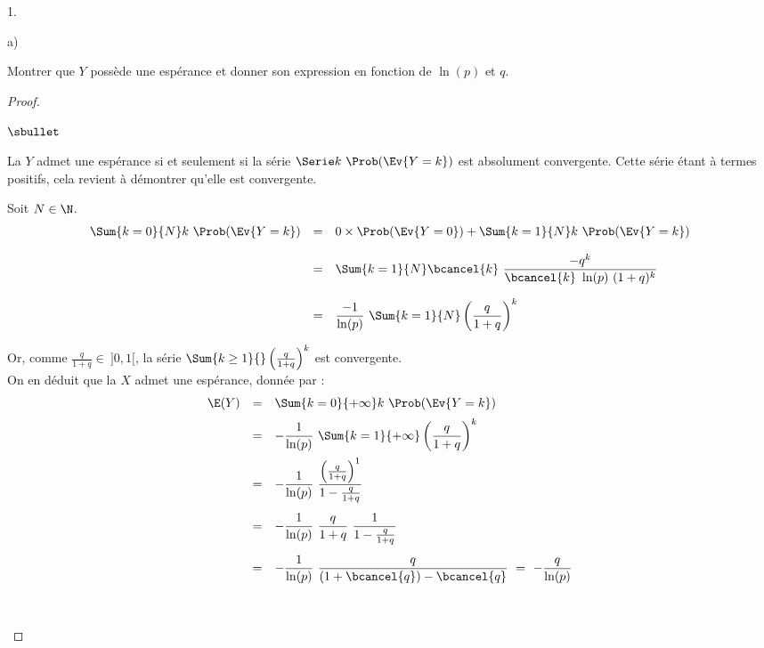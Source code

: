 \documentclass[11pt]{article}%
\begin{document}
\begin{noliste}{1.}
\begin{noliste}{a)}
  \item Montrer que $Y$ possède une espérance et donner son expression
    en fonction de $\ln(p)$ et $q$.

    \begin{proof}~%
      \begin{noliste}{$\sbullet$}
      \item La \var $Y$ admet une espérance si et seulement si la
        série $\Serie k \ \Prob(\Ev{Y = k})$ est absolument
        convergente. Cette série étant à termes positifs, cela
        revient à démontrer qu'elle est convergente.

      \item Soit $N \in \N$.
        \[
        \begin{array}{rcl}
          \Sum{k = 0}{N} k \ \Prob(\Ev{Y = k}) & = & 0 \times \Prob(\Ev{Y =
            0}) + \Sum{k = 1}{N} k \ \Prob(\Ev{Y = k}) 
          \\[.4cm]
          & = & \Sum{k = 1}{N} \bcancel{k} \ \dfrac{-q^k}{\bcancel{k}
            \ \ln(p) \ (1+q)^k} 
          \\[.6cm]
          & = & \dfrac{-1}{\ln(p)} \ \Sum{k = 1}{N}
          \left(\dfrac{q}{1+q} \right)^k 
        \end{array}
        \]

      \item Or, comme $\frac{q}{1+q} \in \ ]0, 1[$, la série $\Sum{k
          \geq 1}{} \left( \frac{q}{1+q} \right)^k$ est convergente.\\
        On en déduit que la \var $X$ admet une espérance, donnée par :
        \[
        \begin{array}{rcl}
          \E(Y) & = & \Sum{k=0}{+\infty} k \ \Prob(\Ev{Y = k}) 
          \\[.2cm]
          & = & -\dfrac{1}{\ln(p)} \ \Sum{k=1}{+\infty} \left(\dfrac{q}{1+q}
          \right)^k 
          \\[.4cm]
          & = & -\dfrac{1}{\ln(p)} \ \dfrac{\left( \frac{q}{1+q}
            \right)^1}{1 - \frac{q}{1+q}}
          \\[.6cm]
          & = & -\dfrac{1}{\ln(p)} \ \dfrac{q}{1+q} \ \dfrac{1}{1 -
            \frac{q}{1+q}} 
          \\[.6cm]
          & = & -\dfrac{1}{\ln(p)} \ \dfrac{q}{(1 + \bcancel{q}) -
            \bcancel{q}} \ = \ - \dfrac{q}{\ln(p)}
        \end{array}
        \]

        ~\\[-1.4cm]
      \end{noliste}
    \end{proof}


\end{noliste}
\end{noliste}
\end{document}
